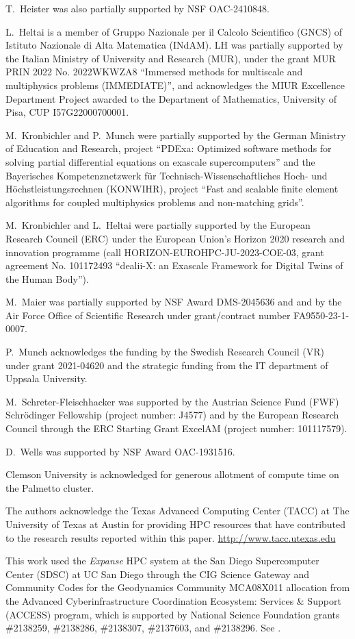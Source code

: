 \documentclass{ansarticle-preprint}
\begin{document}
T.~Heister was also partially supported by NSF OAC-2410848.

L.~Heltai is a member of Gruppo Nazionale per il Calcolo Scientifico (GNCS) of
Istituto Nazionale di Alta Matematica (INdAM). LH was partially supported by
the Italian Ministry of University and Research (MUR), under the grant MUR PRIN
2022 No. 2022WKWZA8 ``Immersed methods for multiscale and multiphysics problems
(IMMEDIATE)'', and acknowledges the MIUR Excellence Department Project awarded
to the Department of Mathematics, University of Pisa, CUP I57G22000700001. 

M.~Kronbichler and P.~Munch were partially supported by the
German Ministry of Education and Research, project
``PDExa: Optimized software methods for solving partial differential
equations on exascale supercomputers'' and the Bayerisches Kompetenznetzwerk
f\"ur Technisch-Wissen\-schaft\-li\-ches Hoch- und H\"ochstleistungsrechnen
(KONWIHR), project ``Fast and scalable finite element algorithms for coupled
multiphysics problems and non-matching grids''.

M.~Kronbichler and L.~Heltai were partially supported by the European Research
Council (ERC) under the European Union's Horizon 2020 research and innovation
programme (call HORIZON-EUROHPC-JU-2023-COE-03, grant agreement No. 101172493
``dealii-X: an Exascale Framework for Digital Twins of the Human Body'').

M.~Maier was partially supported by NSF Award DMS-2045636 and and by the
Air Force Office of Scientific Research under grant/contract number
FA9550-23-1-0007.

P.~Munch acknowledges the funding by the Swedish Research Council (VR) under grant 2021-04620 and the strategic funding from the IT department of Uppsala University.

M.~Schreter-Fleischhacker was supported by the Austrian Science Fund (FWF) Schrödinger Fellowship (project number: J4577) and by the European Research Council
through the ERC Starting Grant ExcelAM (project number: 101117579).

D.~Wells was supported by NSF Award OAC-1931516.

Clemson University is acknowledged for generous allotment of compute
time on the Palmetto cluster.

The authors acknowledge the Texas Advanced Computing Center (TACC) at The University of Texas at Austin for providing HPC resources that have contributed to the research results reported within this paper. \url{http://www.tacc.utexas.edu}

This work used the \textit{Expanse} HPC system at the San Diego Supercomputer Center (SDSC) at UC San Diego through the CIG Science Gateway and Community Codes for the Geodynamics Community MCA08X011 allocation from the Advanced Cyberinfrastructure Coordination Ecosystem: Services \& Support (ACCESS) program, which is supported by National Science Foundation grants \#2138259, \#2138286, \#2138307, \#2137603, and \#2138296. See \cite{Boerner2023}.


{}

\end{document}
